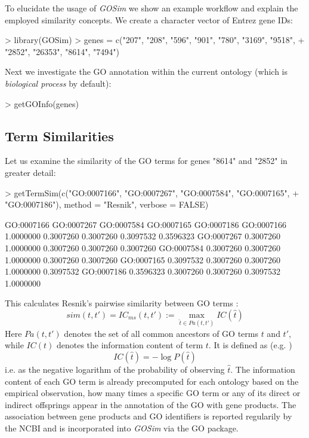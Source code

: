 \documentclass[12pt,a4paper]{article}
\begin{document}
To elucidate the usage of \emph{GOSim} we show an example workflow and explain the employed similarity concepts. We create  a character vector of Entrez gene IDs:
\begin{Schunk}
\begin{Sinput}
> library(GOSim)
> genes = c("207", "208", "596", "901", "780", "3169", "9518", 
+     "2852", "26353", "8614", "7494")
\end{Sinput}
\end{Schunk}
Next we investigate the GO annotation within the current ontology (which is \emph{biological process} by default):
\begin{Schunk}
\begin{Sinput}
> getGOInfo(genes)
\end{Sinput}
\end{Schunk}

\subsection{Term Similarities}

Let us examine the similarity of the GO terms for genes "8614" and "2852" in greater detail:
\begin{Schunk}
\begin{Sinput}
> getTermSim(c("GO:0007166", "GO:0007267", "GO:0007584", "GO:0007165", 
+     "GO:0007186"), method = "Resnik", verbose = FALSE)
\end{Sinput}
\begin{Soutput}
           GO:0007166 GO:0007267 GO:0007584 GO:0007165 GO:0007186
GO:0007166  1.0000000  0.3007260  0.3007260  0.3097532  0.3596323
GO:0007267  0.3007260  1.0000000  0.3007260  0.3007260  0.3007260
GO:0007584  0.3007260  0.3007260  1.0000000  0.3007260  0.3007260
GO:0007165  0.3097532  0.3007260  0.3007260  1.0000000  0.3097532
GO:0007186  0.3596323  0.3007260  0.3007260  0.3097532  1.0000000
\end{Soutput}
\end{Schunk}
This calculates Resnik's pairwise similarity between GO terms \cite{Resnik95,Resnik99}:
\begin{equation}
sim(t,t') = IC_{ms}(t,t') := \max_{\hat{t}\in Pa(t,t')} IC(\hat{t})\label{eq:Resnik}
\end{equation}
Here $Pa(t,t')$ denotes the set of all common ancestors of GO terms $t$ and $t'$, while $IC(t)$  denotes the information content of term $t$. It is defined as (e.g. \cite{Lord03})
\begin{equation}
IC(\hat{t}) = -\log P(\hat{t})
\end{equation}
i.e. as the negative logarithm of the probability of observing $\hat{t}$. The information content of each GO term is already precomputed for each ontology based on the empirical observation, how many times a specific GO term or any of its direct or indirect offsprings appear in the annotation of the GO with gene products. The association between gene products and GO identifiers is reported regularily by the NCBI and is incorporated into \emph{GOSim} via the GO package.
\end{document}
